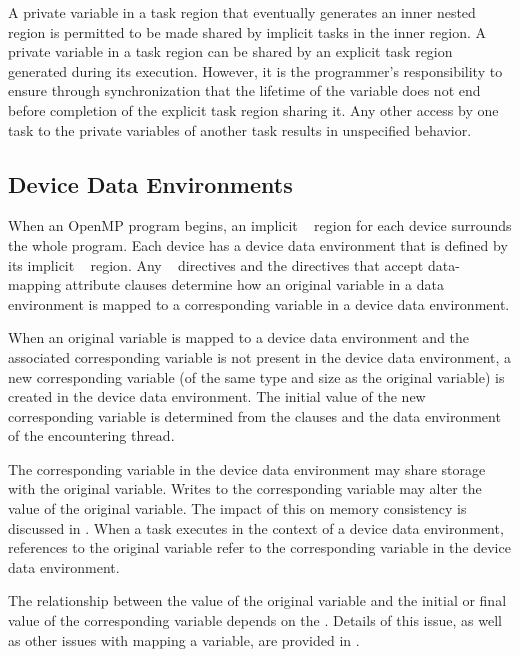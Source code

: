 A private variable in a task region that eventually generates an inner nested 
region is permitted to be made shared by implicit tasks in the inner  region.
A private variable in a task region can be shared by an explicit task region generated
during its execution. However, it is the programmer’s responsibility to ensure through
synchronization that the lifetime of the variable does not end before completion of the
explicit task region sharing it. Any other access by one task to the
private variables of another task results in unspecified behavior.




\subsection{Device Data Environments}
\label{subsec:Device Data Environments}
When an OpenMP program begins, an implicit ~ region for each device surrounds the whole program. Each device has a device data environment that is defined by its implicit ~ region. Any ~ directives and the directives that accept data-mapping attribute clauses determine how an original variable in a data environment is mapped to a corresponding variable in a device data environment.

When an original variable is mapped to a device data environment and the associated corresponding variable is not present in the device data environment, a new corresponding variable (of the same type and size as the original variable) is created in the device data environment. The initial value of the new corresponding variable is determined from the clauses and the data environment of the encountering thread.

The corresponding variable in the device data environment may share storage with the
original variable. Writes to the corresponding variable may alter the value of the original
variable. The impact of this on memory consistency is discussed in 
. 
When a task executes in the context of a device data environment, references to  
the original variable refer to the corresponding variable in the device data environment.

The relationship between the value of the original variable and the initial or final value
of the corresponding variable depends on the . Details of this issue, as well as
other issues with mapping a variable, are provided in .

